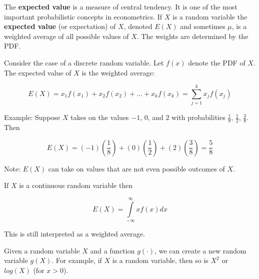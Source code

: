 \documentclass[11pt]{article}
\begin{document}
\vspace{2mm}

The \textbf{expected value} is a measure of central tendency. It is one of the most important probabilistic 
concepts in econometrics. If $X$ is a random variable the \textbf{expected value} (or expectation) of $X$,
denoted $E(X)$ and sometimes $\mu$, is a weighted average of all possible values of $X$. The weights are 
determined by the PDF.

\vspace{2mm}

Consider the case of a discrete random variable. Let $f(x)$ denote the PDF of $X$. The expected value of $X$
is the weighted average:

\begin{equation*}
E(X) = x_{1}f(x_{1}) + x_{2}f(x_{2}) + \ldots + x_{k}f(x_{k}) = \sum\limits_{j=1}^{k} x_{j}f(x_{j})
\end{equation*}

\vspace{2mm}

Example: Suppose $X$ takes on the values $-1$, $0$, and $2$ with probabilities $\frac{1}{8}$, $\frac{1}{2}$,
$\frac{3}{8}$. Then 

\begin{equation*}
E(X) = (-1)(\frac{1}{8}) + (0)(\frac{1}{2}) + (2)(\frac{3}{8}) = \frac{5}{8}
\end{equation*}

\vspace{2mm}

Note: $E(X)$ can take on values that are not even possible outcomes of $X$.

\vspace{2mm}

If $X$ is a continuous random variable then 

\begin{equation*}
E(X) = \int\limits_{-\infty}^{\infty} xf(x)dx
\end{equation*}

This is still interpreted as a weighted average.

\vspace{2mm}

Given a random variable $X$ and a function $g(\cdot)$, we can create a new random variable $g(X)$. For example, 
if $X$ is a random variable, then so is $X^{2}$ or $log(X)$ (for $x > 0$).

\vspace{2mm}
\end{document}
